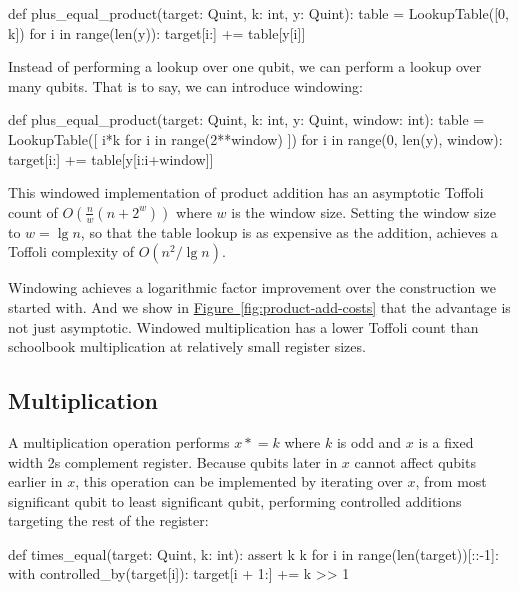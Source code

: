 \documentclass[onecolumn,unpublished]{quantumarticle}
\theoremstyle{definition}
\theoremstyle{definition}
\theoremstyle{definition}
\newcommand{\fig}[1]{\hyperref[fig:#1]{Figure~\ref*{fig:#1}}}
\newcommand{\timeseq}{\mathrel{\ast}=}
\begin{document}
\begin{python}
    def plus_equal_product(target: Quint, k: int, y: Quint):
        table = LookupTable([0, k])
        for i in range(len(y)):
            target[i:] += table[y[i]]
\end{python}

Instead of performing a lookup over one qubit, we can perform a lookup over many qubits.
That is to say, we can introduce windowing:

\begin{python}
    def plus_equal_product(target: Quint,
                           k: int,
                           y: Quint,
                           window: int):
        table = LookupTable([
            i*k
            for i in range(2**window)
        ])
        for i in range(0, len(y), window):
            target[i:] += table[y[i:i+window]]
\end{python}

This windowed implementation of product addition has an asymptotic Toffoli count of $O(\frac{n}{w} (n + 2^w))$ where $w$ is the window size.
Setting the window size to $w=\lg n$, so that the table lookup is as expensive as the addition, achieves a Toffoli complexity of $O(n^2/\lg n)$.

Windowing achieves a logarithmic factor improvement over the construction we started with.
And we show in \fig{product-add-costs} that the advantage is not just asymptotic.
Windowed multiplication has a lower Toffoli count than schoolbook multiplication at relatively small register sizes.


\subsection{Multiplication}

A multiplication operation performs $x \timeseq k$ where $k$ is odd and $x$ is a fixed width 2s complement register.
Because qubits later in $x$ cannot affect qubits earlier in $x$, this operation can be implemented by iterating over $x$, from most significant qubit to least significant qubit, performing controlled additions targeting the rest of the register:

\begin{python}
    def times_equal(target: Quint, k: int):
        assert k %
        k %
        for i in range(len(target))[::-1]:
            with controlled_by(target[i]):
                target[i + 1:] += k >> 1
\end{python}
\end{document}
